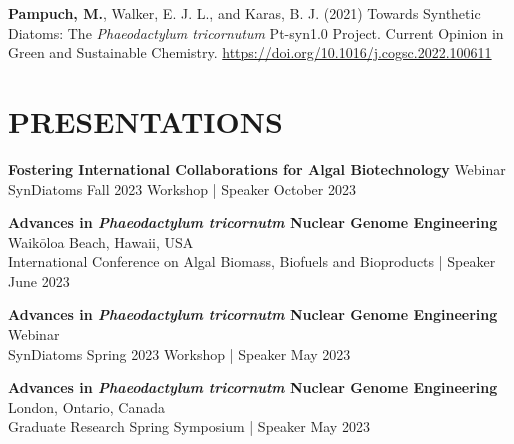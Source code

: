 \documentclass[a4paper,9pt]{extarticle}
\begin{document}
\noindent
\begin{minipage}{1\textwidth}
\setlength{\parindent}{15pt} %
	\noindent
	\textbf{Pampuch, M.}, Walker, E. J. L., and Karas, B. J. (2021) Towards Synthetic Diatoms: The \textit{Phaeodactylum tricornutum} Pt-syn1.0 Project. Current Opinion in Green and Sustainable Chemistry. \href{https://doi.org/10.1016/j.cogsc.2022.100611}{https://doi.org/10.1016/j.cogsc.2022.100611}
\end{minipage}

    
\section*{PRESENTATIONS}
\noindent
\begin{minipage}{1\textwidth}
\setlength{\parindent}{15pt} %
	\noindent
	\textbf{Fostering International Collaborations for Algal Biotechnology}  \hfill Webinar\\ 
	SynDiatoms Fall 2023 Workshop | Speaker  \hfill October 2023\\
\end{minipage}

\noindent
\begin{minipage}{1\textwidth}
\setlength{\parindent}{15pt} %
	\noindent
	\textbf{Advances in \textit{Phaeodactylum tricornutm} Nuclear Genome Engineering}  \hfill Waik$\mathrm{\bar{o}}$loa Beach, Hawaii, USA\\ 
	International Conference on Algal Biomass, Biofuels and Bioproducts | Speaker  \hfill June 2023\\
\end{minipage}

\noindent
\begin{minipage}{1\textwidth}
\setlength{\parindent}{15pt} %
	\noindent
	\textbf{Advances in \textit{Phaeodactylum tricornutm} Nuclear Genome Engineering}  \hfill Webinar\\ 
	SynDiatoms Spring 2023 Workshop | Speaker  \hfill May 2023\\
\end{minipage}

\noindent
\begin{minipage}{1\textwidth}
\setlength{\parindent}{15pt} %
	\noindent
	\textbf{Advances in \textit{Phaeodactylum tricornutm} Nuclear Genome Engineering}  \hfill London, Ontario, Canada\\ 
	Graduate Research Spring Symposium | Speaker  \hfill May 2023\\
\end{minipage}
\end{document}
